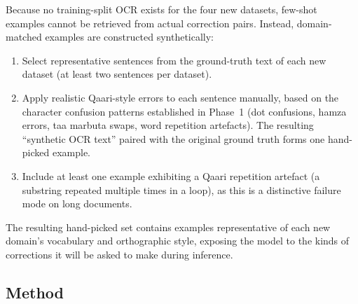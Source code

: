 Because no training-split OCR exists for the four new datasets, few-shot
examples cannot be retrieved from actual correction pairs. Instead,
domain-matched examples are constructed synthetically:

\begin{enumerate}
  \item Select representative sentences from the ground-truth text of each
        new dataset (at least two sentences per dataset).
  \item Apply realistic Qaari-style errors to each sentence manually,
        based on the character confusion patterns established in Phase~1
        (dot confusions, hamza errors, taa marbuta swaps, word repetition
        artefacts). The resulting ``synthetic OCR text'' paired with the
        original ground truth forms one hand-picked example.
  \item Include at least one example exhibiting a Qaari repetition artefact
        (a substring repeated multiple times in a loop), as this is a
        distinctive failure mode on long documents.
\end{enumerate}

The resulting hand-picked set contains examples representative of each new
domain's vocabulary and orthographic style, exposing the model to the kinds
of corrections it will be asked to make during inference.

\subsection{Method}
\label{subsec:exp2_method}

